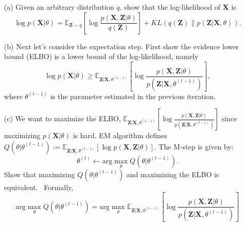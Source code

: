 \documentclass[10pt]{article}
\begin{document}
\begin{enumerate}[1.]
	      \begin{itemize}
		      \item[(a)] Given an arbitrary distribution $q$, show that the log-likelihood of $\boldsymbol{X}$ is~
                    \begin{equation}
                        \log p(\boldsymbol{X}|\theta) = \mathbb{E}_{\boldsymbol{Z}\sim q}\left [ \log  \frac{p(\boldsymbol{X}, \boldsymbol{Z}|\theta)}{q(\boldsymbol{Z})}\right ] + KL\left(q(\boldsymbol{Z})\| p(\boldsymbol{Z}|\boldsymbol{X},\theta)\right).
                    \end{equation}
		      \item[(b)] Next let's consider the expectation step. First show the evidence lower bound (ELBO) is a lower bound of the log-likelihood, namely~
                    \begin{equation}
                        \log p(\boldsymbol{X}|\theta)\geq\mathbb{E}_{\boldsymbol{Z}|\boldsymbol{X},\theta^{(t-1)}}\left[\log \frac{p(\boldsymbol{X},\boldsymbol{Z}|\theta)}{p(\boldsymbol{Z}|\boldsymbol{X},\theta^{(t-1)})}\right],
                    \end{equation}
                    where $\theta^{(t-1)}$ is the parameter estimated in the previous iteration.
		      \item[(c)] We want to maximize the ELBO, $\mathbb{E}_{\boldsymbol{Z}|\boldsymbol{X},\theta^{(t-1)}}\left[\log \frac{p(\boldsymbol{X},\boldsymbol{Z}|\theta)}{p(\boldsymbol{Z}|\boldsymbol{X},\theta^{(t-1)})}\right]$ since maximizing $p(\boldsymbol{X}|\theta)$ is hard. EM algorithm defines $Q(\theta|\theta^{(t-1)}) := \mathbb{E}_{\boldsymbol{Z}|\boldsymbol{X},\theta^{(t-1)}}\left[ \log p(\boldsymbol{X},\boldsymbol{Z}|\theta) \right]$. The M-step is given by:
                    \begin{equation}
                        \theta^{(t)} \leftarrow \text{arg}\max_{\theta} Q(\theta|\theta^{(t-1)}). 
                    \end{equation}
                    Show that maximizing $Q(\theta|\theta^{(t-1)})$ and maximizing the ELBO is equivalent.~ Formally,
                    \begin{equation}
                        \text{arg}\max_{\theta} Q(\theta|\theta^{(t-1)}) = \text{arg}\max_{\theta} \mathbb{E}_{\boldsymbol{Z}|\boldsymbol{X},\theta^{(t-1)}}\left[\log \frac{p(\boldsymbol{X},\boldsymbol{Z}|\theta)}{p(\boldsymbol{Z}|\boldsymbol{X},\theta^{(t-1)})}\right]
                    \end{equation}


\end{itemize}
\end{enumerate}
\end{document}
